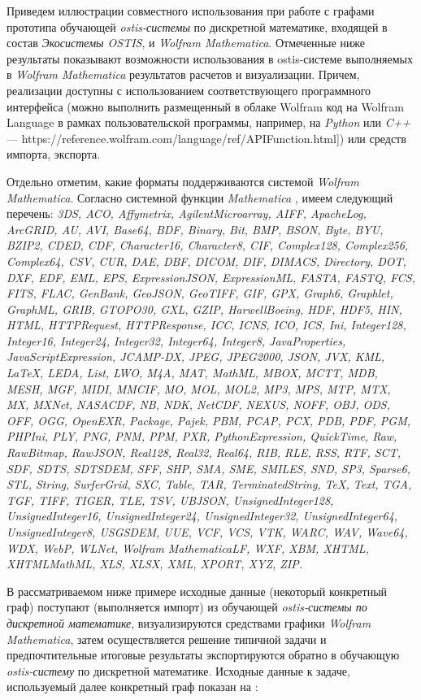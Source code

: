 Приведем иллюстрации совместного использования при работе с графами прототипа обучающей \textit{ostis-системы} по дискретной математике, входящей в состав \textit{Экосистемы OSTIS}, и \textit{Wolfram Mathematica}. Отмеченные ниже результаты показывают возможности использования в ostis-системе выполняемых в \textit{Wolfram Mathematica} результатов расчетов и визуализации. Причем, реализации доступны с использованием соответствующего программного интерфейса (можно выполнить размещенный в облаке Wolfram код на Wolfram Language в рамках пользовательской программы, например, на \textit{Python} или \textit{C++} --- https://reference.wolfram.com/language/ref/APIFunction.html]) или средств импорта, экспорта. 

Отдельно отметим, какие форматы поддерживаются системой \textit{Wolfram Mathematica}. Согласно системной функции \textit{Mathematica} , имеем следующий перечень:
\textit{3DS, ACO, Affymetrix, AgilentMicroarray, AIFF, ApacheLog, ArcGRID, AU, AVI, Base64, BDF, Binary, Bit, BMP, BSON, Byte, BYU, BZIP2, CDED, CDF, Character16, Character8, CIF, Complex128, Complex256, Complex64, CSV, CUR, DAE, DBF, DICOM, DIF, DIMACS, Directory, DOT, DXF, EDF, EML, EPS, ExpressionJSON, ExpressionML, FASTA, FASTQ, FCS, FITS, FLAC, GenBank, GeoJSON, GeoTIFF, GIF, GPX, Graph6, Graphlet, GraphML, GRIB, GTOPO30, GXL, GZIP, HarwellBoeing, HDF, HDF5, HIN, HTML, HTTPRequest, HTTPResponse, ICC, ICNS, ICO, ICS, Ini, Integer128, Integer16, Integer24, Integer32, Integer64, Integer8, JavaProperties, JavaScriptExpression, JCAMP-DX, JPEG, JPEG2000, JSON, JVX, KML, LaTeX, LEDA, List, LWO, M4A, MAT, MathML, MBOX, MCTT, MDB, MESH, MGF, MIDI, MMCIF, MO, MOL, MOL2, MP3, MPS, MTP, MTX, MX, MXNet, NASACDF, NB, NDK, NetCDF, NEXUS, NOFF, OBJ, ODS, OFF, OGG, OpenEXR, Package, Pajek, PBM, PCAP, PCX, PDB, PDF, PGM, PHPIni, PLY, PNG, PNM, PPM, PXR, PythonExpression, QuickTime, Raw, RawBitmap, RawJSON, Real128, Real32, Real64, RIB, RLE, RSS, RTF, SCT, SDF, SDTS, SDTSDEM, SFF, SHP, SMA, SME, SMILES, SND, SP3, Sparse6, STL, String, SurferGrid, SXC, Table, TAR, TerminatedString, TeX, Text, TGA, TGF, TIFF, TIGER, TLE, TSV, UBJSON, UnsignedInteger128, UnsignedInteger16, UnsignedInteger24, UnsignedInteger32, UnsignedInteger64, UnsignedInteger8, USGSDEM, UUE, VCF, VCS, VTK, WARC, WAV, Wave64, WDX, WebP, WLNet, Wolfram MathematicaLF, WXF, XBM, XHTML, XHTMLMathML, XLS, XLSX, XML, XPORT, XYZ, ZIP.}

В рассматриваемом ниже примере исходные данные (некоторый конкретный граф) поступают (выполняется импорт) из обучающей \textit{ostis-системы по дискретной математике}, визуализируются средствами графики \textit{Wolfram Mathematica}, затем осуществляется решение типичной задачи и предпочтительные итоговые результаты экспортируются обратно в обучающую \textit{ostis-систему} по дискретной математике. Исходные данные к задаче, используемый далее конкретный граф показан на \textit{}:

